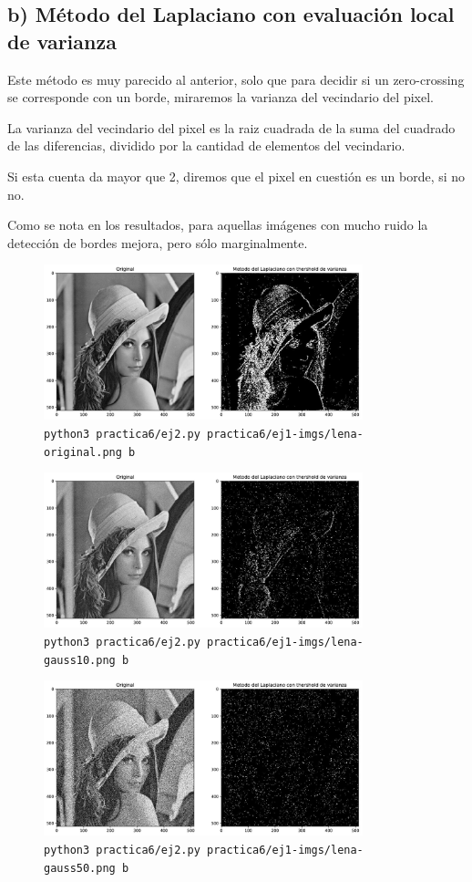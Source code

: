 \documentclass[11pt, spanish]{article}
\begin{document}
\newpage
\subsection{b) Método del Laplaciano con evaluación local de varianza}

Este método es muy parecido al anterior, solo que para decidir si un zero-crossing se corresponde con un borde, miraremos la varianza del vecindario del pixel.

La varianza del vecindario del pixel es la raiz cuadrada de la suma del cuadrado de las diferencias, dividido por la cantidad de elementos del vecindario.

Si esta cuenta da mayor que 2, diremos que el pixel en cuestión es un borde, si no no.

Como se nota en los resultados, para aquellas imágenes con mucho ruido la detección de bordes mejora, pero sólo marginalmente.


\begin{figure}[H]
\centering
    \includegraphics[height=4.5cm]{informe-imgs/ej2-b-lena-original.jpg}
    \caption{\texttt{python3 practica6/ej2.py practica6/ej1-imgs/lena-original.png b}}
\end{figure}

\begin{figure}[H]
\centering
    \includegraphics[height=4.5cm]{informe-imgs/ej2-b-lena-gauss10.jpg}
    \caption{\texttt{python3 practica6/ej2.py practica6/ej1-imgs/lena-gauss10.png b}}
\end{figure}

\begin{figure}[H]
\centering
    \includegraphics[height=4.5cm]{informe-imgs/ej2-b-lena-gauss50.jpg}
    \caption{\texttt{python3 practica6/ej2.py practica6/ej1-imgs/lena-gauss50.png b}}
\end{figure}
\end{document}
